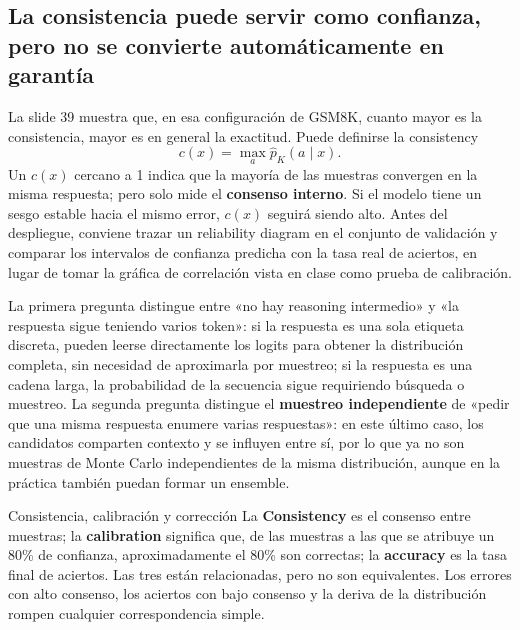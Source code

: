 
\subsection{La consistencia puede servir como confianza, pero no se convierte automáticamente en garantía}

La slide 39 muestra que, en esa configuración de GSM8K, cuanto mayor es la consistencia, mayor es en general la exactitud. Puede definirse la consistency
\[
c(x)=\max_a\widehat p_K(a\mid x).
\]
Un $c(x)$ cercano a 1 indica que la mayoría de las muestras convergen en la misma respuesta; pero solo mide el \textbf{consenso interno}. Si el modelo tiene un sesgo estable hacia el mismo error, $c(x)$ seguirá siendo alto. Antes del despliegue, conviene trazar un reliability diagram en el conjunto de validación y comparar los intervalos de confianza predicha con la tasa real de aciertos, en lugar de tomar la gráfica de correlación vista en clase como prueba de calibración.



La primera pregunta distingue entre «no hay reasoning intermedio» y «la respuesta sigue teniendo varios token»: si la respuesta es una sola etiqueta discreta, pueden leerse directamente los logits para obtener la distribución completa, sin necesidad de aproximarla por muestreo; si la respuesta es una cadena larga, la probabilidad de la secuencia sigue requiriendo búsqueda o muestreo. La segunda pregunta distingue el \textbf{muestreo independiente} de «pedir que una misma respuesta enumere varias respuestas»: en este último caso, los candidatos comparten contexto y se influyen entre sí, por lo que ya no son muestras de Monte Carlo independientes de la misma distribución, aunque en la práctica también puedan formar un ensemble.

\begin{knowledgebox}{Consistencia, calibración y corrección}
La \textbf{Consistency} es el consenso entre muestras; la \textbf{calibration} significa que, de las muestras a las que se atribuye un 80\% de confianza, aproximadamente el 80\% son correctas; la \textbf{accuracy} es la tasa final de aciertos. Las tres están relacionadas, pero no son equivalentes. Los errores con alto consenso, los aciertos con bajo consenso y la deriva de la distribución rompen cualquier correspondencia simple.
\end{knowledgebox}

